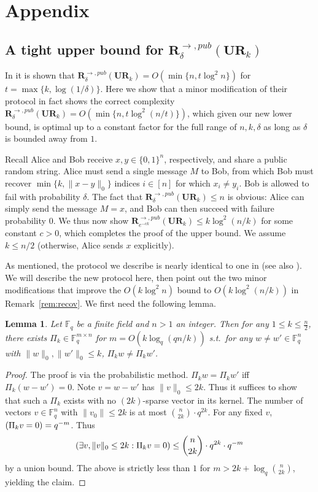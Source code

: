 \documentclass[11pt]{article}
\newtheorem{lemma}{Lemma}
\let\Pr\relax
\DeclareMathOperator*{\Pr}{\mathbb{P}}
\newcommand{\F}{\mathbb{F}}
\newcommand{\ur}{\mathbf{UR}\xspace}
\newcommand{\randcom}{\mathbf{R}}
\begin{document}
\appendix

\section{Appendix}

\subsection{A tight upper bound for $\randcom^{\rightarrow,pub}_\delta(\ur_k)$}

In \cite[Proposition 1]{JowhariST11} it is shown that $\randcom^{\rightarrow,pub}_\delta(\ur_k) = O(\min\{n,t\log^2 n\})$ for $t = \max\{k,\log(1/\delta)\}$. Here we show that a minor modification of their protocol in fact shows the correct complexity $\randcom^{\rightarrow,pub}_\delta(\ur_k) = O(\min\{n,t\log^2(n/t)\})$, which given our new lower bound, is optimal up to a constant factor for the full range of $n,k,\delta$ as long as $\delta$ is bounded away from $1$.

Recall Alice and Bob receive $x, y\in\{0,1\}^n$, respectively, and share a public random string. Alice must send a single message $M$ to Bob, from which Bob must recover $\min\{k, \|x-y\|_0\}$ indices $i\in[n]$ for which $x_i\neq y_i$. Bob is allowed to fail with probability $\delta$. The fact that $\randcom^{\rightarrow,pub}_\delta(\ur_k) \le n$ is obvious: Alice can simply send the message $M = x$, and Bob can then succeed with failure probability $0$. We thus now show $\randcom^{\rightarrow,pub}_{e^{-ck}}(\ur_k) \le k\log^2(n/k)$ for some constant $c>0$, which completes the proof of the upper bound. We assume $k\le n/2$ (otherwise, Alice sends $x$ explicitly).

As mentioned, the protocol we describe is nearly identical to one in \cite{JowhariST11} (see also \cite{CormodeF14}). We will describe the new protocol here, then point out the two minor modifications that improve the $O(k\log^2 n)$ bound to $O(k\log^2(n/k))$ in Remark~\ref{rem:recov}. We first need the following lemma.

\begin{lemma}\label{lem:sparse-recov}
Let $\F_q$ be a finite field and $n>1$ an integer. Then for any $1\le k\le \frac n2$, there exists $\Pi_k\in \F_q^{m\times n}$ for $m = O(k\log_q(qn/k))$ s.t.\ for any $w\neq w'\in\F_q^n$ with $\|w\|_0, \|w'\|_0 \le k$, $\Pi_k w \neq \Pi_k w'$.
\end{lemma}
\begin{proof}
The proof is via the probabilistic method. $\Pi_k w = \Pi_k w'$ iff $\Pi_k (w - w') = 0$. Note $v = w-w'$ has $\|v\|_0 \le 2k$. Thus it suffices to show that such a $\Pi_k$ exists with no $(2k)$-sparse vector in its kernel. The number of vectors $v\in\F_q^n$ with $\|v_0\| \le 2k$ is at most $\binom{n}{2k}\cdot q^{2k}$. For any fixed $v$, $\Pr(\Pi_k v = 0) = q^{-m}$. Thus 
$$\Pr(\exists v, \|v\|_0 \le 2k: \Pi_k v = 0) \le \binom{n}{2k}\cdot q^{2k} \cdot q^{-m}$$ 
by a union bound. The above is strictly less than $1$ for $m > 2k + \log_q\binom{n}{2k}$, yielding the claim.
\end{proof}
\end{document}
